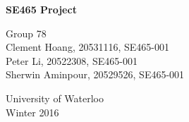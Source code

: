 \documentclass{article}
\title{}
\author{Clement Hoang }
\date{Winter 2016}
\begin{document}
  \begin{titlepage}
      \begin{center}
          \vspace*{1cm}

          \Huge
          \textbf{SE465 Project}

          \vspace{1.5cm}

          \Large
          Group 78 \\
          Clement Hoang, 20531116, SE465-001 \\
          Peter Li, 20522308, SE465-001 \\
          Sherwin Aminpour, 20529526, SE465-001

          \vfill

          \vspace{0.8cm}

          \Large
          University of Waterloo\\
          Winter 2016

      \end{center}
  \end{titlepage}
\end{document}
